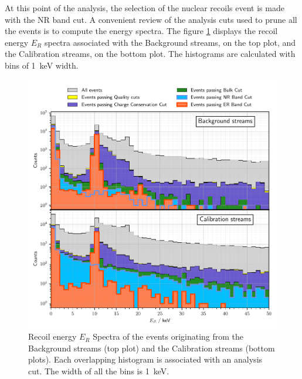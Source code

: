 At this point of the analysis, the selection of the nuclear recoils event is made with the NR band cut. A convenient review of the analysis cuts used to prune all the events is to compute the energy spectra. The figure \ref{fig:cut-histogram} displays the recoil energy $E_R$ spectra associated with the Background streams, on the top plot, and the Calibration streams, on the bottom plot. The histograms are calculated with bins of \SI{1}{\kilo\eV} width.

\begin{figure}
\centering
\includegraphics[scale=1]{Figures/Neutron/cut_histogram.pdf}
\caption{Recoil energy $E_R$ Spectra of the events originating from the Background streams (top plot) and the Calibration streams (bottom plots). Each overlapping histogram is associated with an analysis cut. The width of all the bins is \SI{1}{\kilo\eV}.}
\label{fig:cut-histogram}
\end{figure}

